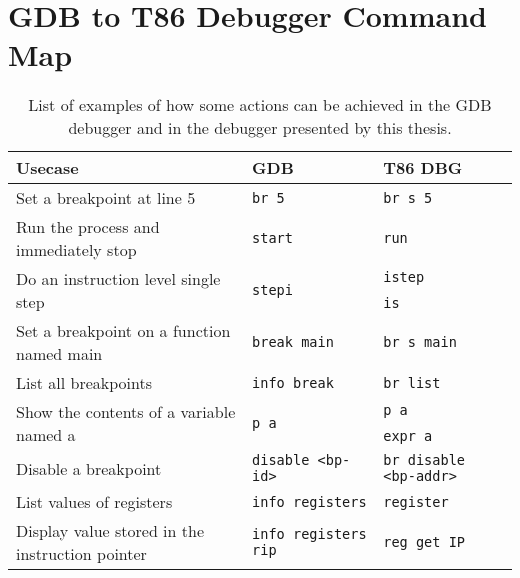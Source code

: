 \chapter{GDB to T86 Debugger Command Map}
\renewcommand{\arraystretch}{1.2}
\begin{table}[h]
\centering
    \begin{tabular}{p{5cm}ll}
        \hline
Usecase                                                  & GDB                                    & T86 DBG                                     \\
        \hline
Set a breakpoint at line 5                           & \texttt{br 5}                                   & \texttt{br s 5}                                      \\
Run the process and immediately stop                     & \texttt{start}                                  & \texttt{run}                                        \\
\multirow{2}{=}{Do an instruction level single step}     & \multirow{2}{*}{\texttt{stepi}}                 & \texttt{istep}                                      \\
                                                         &                                        & \texttt{is}                                         \\
Set a breakpoint on a function named main                & \texttt{break main}                             & \texttt{br s main}                                   \\
List all breakpoints                                     & \texttt{info break}                             & \texttt{br list}                                     \\
\multirow{2}{=}{Show the contents of a variable named a} & \multirow{2}{*}{\texttt{p a}}                   & \texttt{p a}                                         \\
                                                         &                                                 & \texttt{expr a}                                      \\
Disable a breakpoint                                     & \texttt{disable <bp-id>} & \texttt{br disable <bp-addr>} \\
List values of registers                                 & \texttt{info registers}                         & \texttt{register}                              \\
Display value stored in the instruction pointer          & \texttt{info registers rip}                     & \texttt{reg get IP}\\
        \hline
\end{tabular}
\caption{List of examples of how some actions can be achieved in the GDB debugger and in
the debugger presented by this thesis.}
\label{table:gdb-vs-dbg}
\end{table}
